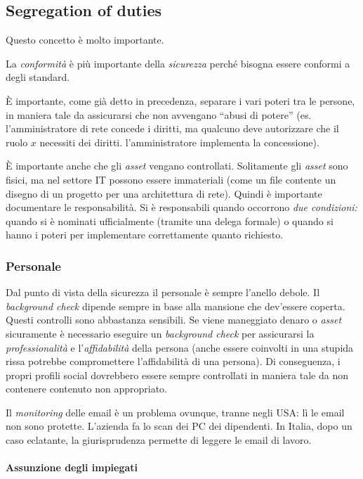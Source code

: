 \subsection{Segregation of duties}

Questo concetto è molto importante.

La \textit{conformità} è più importante della \textit{sicurezza} perché bisogna 
essere conformi a degli standard.

È importante, come già detto in precedenza, separare i vari 
poteri tra le persone, in maniera tale da assicurarsi che non avvengano ``abusi 
di potere'' (es. l'amministratore di rete concede i diritti, ma qualcuno deve autorizzare che il 
ruolo $x$ necessiti dei diritti. l'amministratore implementa la concessione). 

È importante anche che gli \textit{asset} vengano controllati. Solitamente gli 
\textit{asset} sono fisici, ma nel settore IT possono essere immateriali (come 
un file contente un disegno di un progetto per una architettura di rete). Quindi 
è importante documentare le responsabilità. Si è responsabili quando occorrono 
\textit{due condizioni:} quando si è nominati ufficialmente (tramite una delega formale) o
quando si hanno i poteri per implementare correttamente quanto richiesto.

\subsubsection{Personale}

Dal punto di vista della sicurezza il personale è sempre l'anello debole. 
Il \textit{background check} dipende sempre in base alla mansione che 
dev'essere coperta. Questi controlli sono abbastanza sensibili.
Se viene maneggiato denaro o \textit{asset} sicuramente è necessario eseguire 
un \textit{background check} per assicurarsi la \textit{professionalità} e 
l'\textit{affidabilità} della persona (anche essere coinvolti in una stupida 
rissa potrebbe compromettere l'affidabilità di una persona). Di conseguenza, i propri 
profili social dovrebbero essere sempre controllati in maniera 
tale da non contenere contenuto non appropriato.

Il \textit{monitoring} delle email è un problema ovunque, tranne negli USA: 
lì le email non sono protette. L'azienda fa lo scan dei PC dei 
dipendenti. In Italia, dopo un caso eclatante, la giurisprudenza permette di 
leggere le email di lavoro.

\paragraph{Assunzione degli impiegati}


